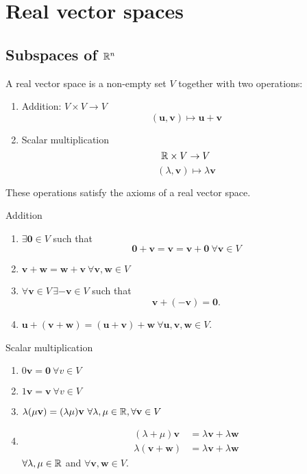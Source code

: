 \documentclass[10pt, a4paper]{article}
\newcommand{\mbf}[1]{\mathbf{#1}}
\begin{document}
\newpage

\section{Real vector spaces}
\subsection{Subspaces of \texorpdfstring{$\mathbb{R} ^ n$}{}}
\begin{definition}
    A real vector space is a non-empty set $V$ together with two operations:
    \begin{enumerate}[label = (\roman*)]
        \item Addition: $V \times V \rightarrow V$
        \[
        (\mbf{u}, \mbf{v}) \mapsto \mbf{u} + \mbf{v}
        \]
        \item Scalar multiplication
        \[
        \mathbb{R} \times V \rightarrow V
        \]
        \[
        (\lambda, \mbf{v}) \mapsto \lambda\mbf{v}
        \]
    \end{enumerate}
    These operations satisfy the axioms of a real vector space.
\end{definition}

Addition
\begin{enumerate}[label = (\roman*)]
    \item $\exists\mbf{0} \in V$ such that
    \[
    \mbf{0} + \mbf{v} = \mbf{v} = \mbf{v} + \mbf{0}\ \forall\mbf{v} \in V
    \]
    \item $\mbf{v + w = w + v}\ \forall \mbf{v, w} \in V$
    \item $\forall\mbf{v} \in V\, \exists -\mbf{v} \in V$ such that
    \[
    \mbf{v} + (-\mbf{v}) = \mbf{0}.
    \]
    \item $\mbf{u + (v + w) = (u + v) + w}\ \forall \mbf{u, v, w} \in V$.
\end{enumerate}

Scalar multiplication
\begin{enumerate}[label = (\roman*)]
    \item $0\mbf{v} = \mbf{0}\ \forall v \in V$
    \item $1\mbf{v} = \mbf{v}\ \forall v \in V$
    \item $\lambda(\mu\mbf{v}) = (\lambda\mu)\mbf{v}\ \forall \lambda, \mu \in \R, \forall \mbf{v} \in V$
    \item
    \begin{align*}
        (\lambda + \mu)\mbf{v} &= \lambda\mbf{v} + \lambda\mbf{w} \\
        \lambda(\mbf{v} + \mbf{w}) &= \lambda\mbf{v} + \lambda\mbf{w}
    \end{align*}
    $\forall \lambda, \mu \in \mathbb{R}$ and $\forall \mbf{v, w} \in V$.
\end{enumerate}
\end{document}

